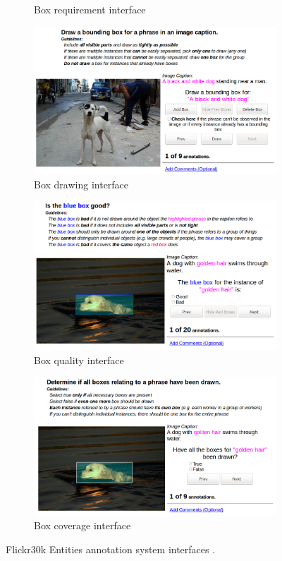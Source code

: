 \begin{figure}
\begin{subfigure}{.45\textwidth}
    \caption{Box requirement interface}
    \label{fig:flickr30k-example-box-requirement}
  \end{subfigure}
  \begin{subfigure}{.45\textwidth}
    \centering
    \includegraphics[width=.8\linewidth]{figures/flickr30k-example-box-drawing.png}
    \caption{Box drawing interface}
    \label{fig:flickr30k-example-box-drawing}
  \end{subfigure}
  \begin{subfigure}{.45\textwidth}
    \centering
    \includegraphics[width=.8\linewidth]{figures/flickr30k-example-box-quality.png}
    \caption{Box quality interface}
    \label{fig:flickr30k-example-box-quality}
  \end{subfigure}
  \begin{subfigure}{.45\textwidth}
    \centering
    \includegraphics[width=.8\linewidth]{figures/flickr30k-example-box-coverage.png}
    \caption{Box coverage interface}
    \label{fig:flickr30k-example-box-coverage}
  \end{subfigure}
  \caption[Flickr30k Entities annotation system interfaces]{Flickr30k Entities annotation system interfaces \cite{plummer2015flickr30k}.}
  \label{fig:flickr30k-example}
\end{figure}

